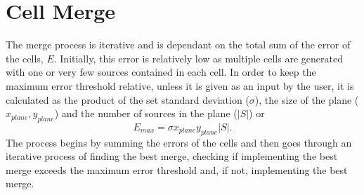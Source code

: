 \section{Cell Merge}
The merge process is iterative and is dependant on the total sum of the error of the cells, $E$. Initially, this error is relatively low as multiple cells are generated with one or very few sources contained in each cell. In order to keep the maximum error threshold relative, unless it is given as an input by the user, it is calculated as the product of the set standard deviation ($\sigma$), the size of the plane ($x_{plane},y_{plane}$) and the number of sources in the plane ($|S|$) or 
\begin{equation}
 E_{max} = \sigma x_{plane}y_{plane}|S|.
\end{equation}
The process begins by summing the errors of the cells and then goes through an iterative process of finding the best merge, checking if implementing the best merge exceeds the maximum error threshold and, if not, implementing the best merge.

